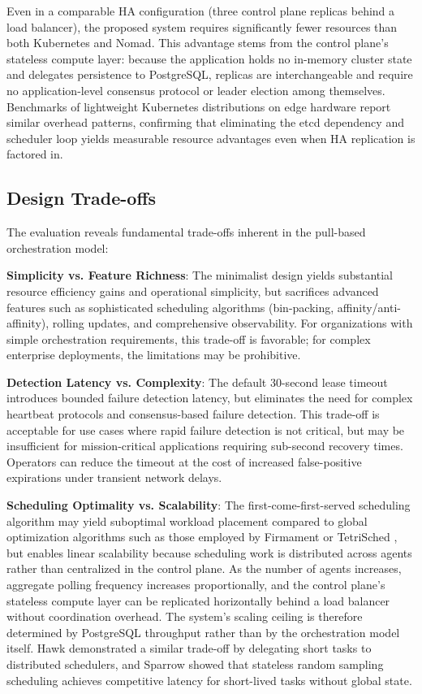 Even in a comparable HA configuration (three control plane replicas behind a load balancer), the proposed system requires significantly fewer resources than both Kubernetes and Nomad. This advantage stems from the control plane's stateless compute layer: because the application holds no in-memory cluster state and delegates persistence to PostgreSQL, replicas are interchangeable and require no application-level consensus protocol or leader election among themselves. Benchmarks of lightweight Kubernetes distributions on edge hardware \cite{cilic2023edgeeval, usman2024lightweight} report similar overhead patterns, confirming that eliminating the etcd dependency and scheduler loop yields measurable resource advantages even when HA replication is factored in.

\subsection{Design Trade-offs}

The evaluation reveals fundamental trade-offs inherent in the pull-based orchestration model:

\textbf{Simplicity vs. Feature Richness}: The minimalist design yields substantial resource efficiency gains and operational simplicity, but sacrifices advanced features such as sophisticated scheduling algorithms (bin-packing, affinity/anti-affinity), rolling updates, and comprehensive observability. For organizations with simple orchestration requirements, this trade-off is favorable; for complex enterprise deployments, the limitations may be prohibitive.

\textbf{Detection Latency vs. Complexity}: The default 30-second lease timeout introduces bounded failure detection latency, but eliminates the need for complex heartbeat protocols and consensus-based failure detection. This trade-off is acceptable for use cases where rapid failure detection is not critical, but may be insufficient for mission-critical applications requiring sub-second recovery times. Operators can reduce the timeout at the cost of increased false-positive expirations under transient network delays.

\textbf{Scheduling Optimality vs. Scalability}: The first-come-first-served scheduling algorithm may yield suboptimal workload placement compared to global optimization algorithms such as those employed by Firmament \cite{gog2016firmament} or TetriSched \cite{tumanov2016tetrisched}, but enables linear scalability because scheduling work is distributed across agents rather than centralized in the control plane. As the number of agents increases, aggregate polling frequency increases proportionally, and the control plane's stateless compute layer can be replicated horizontally behind a load balancer without coordination overhead. The system's scaling ceiling is therefore determined by PostgreSQL throughput rather than by the orchestration model itself. Hawk \cite{delgado2015hawk} demonstrated a similar trade-off by delegating short tasks to distributed schedulers, and Sparrow \cite{ousterhout2013sparrow} showed that stateless random sampling scheduling achieves competitive latency for short-lived tasks without global state.

